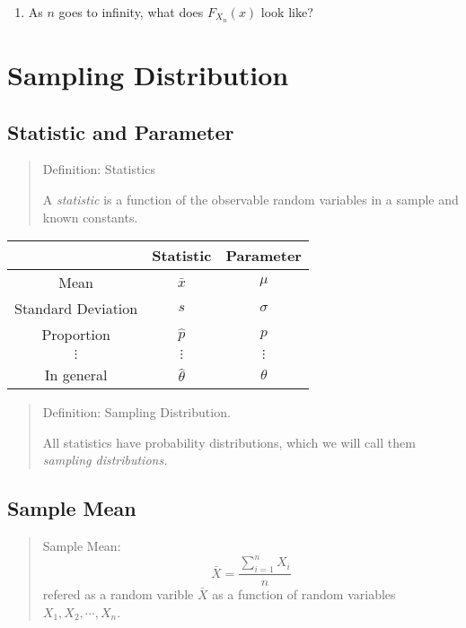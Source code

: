 \documentclass[
  letterpaper,
  DIV=11,
  numbers=noendperiod]{scrreprt}
\providecommand{\tightlist}{%
  \setlength{\itemsep}{0pt}\setlength{\parskip}{0pt}}\usepackage{longtable,booktabs,array}
\theoremstyle{plain}
\theoremstyle{remark}
\begin{document}
\begin{enumerate}
\def\labelenumi{\arabic{enumi}.}
\setcounter{enumi}{2}
\tightlist
\item
  As \(n\) goes to infinity, what does \(F_{X_n}(x)\) look like?
\end{enumerate}

\hypertarget{sampling-distribution}{%
\section{Sampling Distribution}\label{sampling-distribution}}

\hypertarget{statistic-and-parameter}{%
\subsection{Statistic and Parameter}\label{statistic-and-parameter}}

\begin{quote}
Definition: Statistics

A \emph{statistic} is a function of the observable random variables in a
sample and known constants.
\end{quote}

\begin{longtable}[]{@{}ccc@{}}
\toprule\noalign{}
& Statistic & Parameter \\
\midrule\noalign{}
\endhead
\bottomrule\noalign{}
\endlastfoot
Mean & \(\bar{x}\) & \(\mu\) \\
Standard Deviation & \(s\) & \(\sigma\) \\
Proportion & \(\hat{p}\) & \(p\) \\
\(\vdots\) & \(\vdots\) & \(\vdots\) \\
In general & \(\hat{\theta}\) & \(\theta\) \\
\end{longtable}

\begin{quote}
Definition: Sampling Distribution.

All statistics have probability distributions, which we will call them
\emph{sampling distributions.}
\end{quote}

\hypertarget{sample-mean}{%
\subsection{Sample Mean}\label{sample-mean}}

\begin{quote}
Sample Mean: \[
\bar{X}=\frac{\sum_{i=1}^n X_i}{n}
\] refered as a random varible \(\bar{X}\) as a function of random
variables \(X_1,X_2,\cdots, X_n\).
\end{quote}
\end{document}

